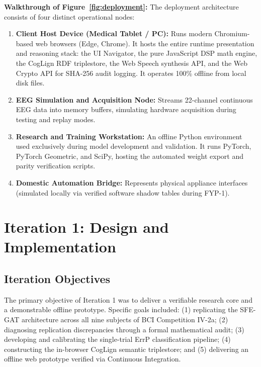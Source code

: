 \documentclass[12pt,a4paper]{report}
\begin{document}
\textbf{Walkthrough of Figure~\ref{fig:deployment}:} The deployment architecture consists of four distinct operational nodes:
\begin{enumerate}[leftmargin=1.5em]
    \item \textbf{Client Host Device (Medical Tablet / PC):} Runs modern Chromium-based web browsers (Edge, Chrome). It hosts the entire runtime presentation and reasoning stack: the UI Navigator, the pure JavaScript DSP math engine, the CogLign RDF triplestore, the Web Speech synthesis API, and the Web Crypto API for SHA-256 audit logging. It operates 100\% offline from local disk files.
    \item \textbf{EEG Simulation and Acquisition Node:} Streams 22-channel continuous EEG data into memory buffers, simulating hardware acquisition during testing and replay modes.
    \item \textbf{Research and Training Workstation:} An offline Python environment used exclusively during model development and validation. It runs PyTorch, PyTorch Geometric, and SciPy, hosting the automated weight export and parity verification scripts.
    \item \textbf{Domestic Automation Bridge:} Represents physical appliance interfaces (simulated locally via verified software shadow tables during FYP-1).
\end{enumerate}

\chapter{Iteration 1: Design and Implementation}

\section{Iteration Objectives}
The primary objective of Iteration 1 was to deliver a verifiable research core and a demonstrable offline prototype. Specific goals included: (1) replicating the SFE-GAT architecture across all nine subjects of BCI Competition IV-2a; (2) diagnosing replication discrepancies through a formal mathematical audit; (3) developing and calibrating the single-trial ErrP classification pipeline; (4) constructing the in-browser CogLign semantic triplestore; and (5) delivering an offline web prototype verified via Continuous Integration.
\end{document}
